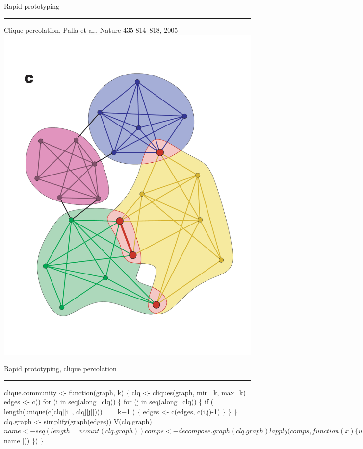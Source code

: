 \documentclass[landscape,fleqno]{foils}
\newcommand{\stitle}[1]{{\color{blue}\Large #1\par\vspace*{10pt}\hrule}}
\newenvironment{narrow}[2]{%
  \begin{list}{}{%
      \setlength{\topsep}{0pt}%
      \setlength{\leftmargin}{#1}%
      \setlength{\rightmargin}{#2}%
      \setlength{\listparindent}{\parindent}%
      \setlength{\itemindent}{\parindent}%
      \setlength{\parsep}{\parskip}}%
    \item[]}{\end{list}}
\begin{document}
\newpage
\stitle{Rapid prototyping}
\begin{narrow}{0cm}{15cm}
Clique percolation, 
Palla et al., Nature 435 814--818, 2005\\
\includegraphics[width=\linewidth]{../images/vicsek}
\end{narrow}

\newpage
\stitle{Rapid prototyping, clique percolation}
\begin{narrow}{0cm}{15cm}
\vspace*{-10pt}
\begin{Myverb}
  clique.community <- function(graph, k) \{
   clq <- cliques(graph, min=k, max=k)
   edges <- c()
   for (i in seq(along=clq)) \{
     for (j in seq(along=clq)) \{
       if ( length(unique(c(clq[[i]], 
             clq[[j]]))) == k+1 ) \{
         edges <- c(edges, c(i,j)-1)
       \}
     \}
   \}
   clq.graph <- simplify(graph(edges))
   V(clq.graph)$name <- 
      seq(length=vcount(clq.graph))
   comps <- decompose.graph(clq.graph)
   
   lapply(comps, function(x) \{
     unique(unlist(clq[ V(x)$name ]))
   \})
  \}
\end{Myverb}
\end{narrow}
\end{document}
